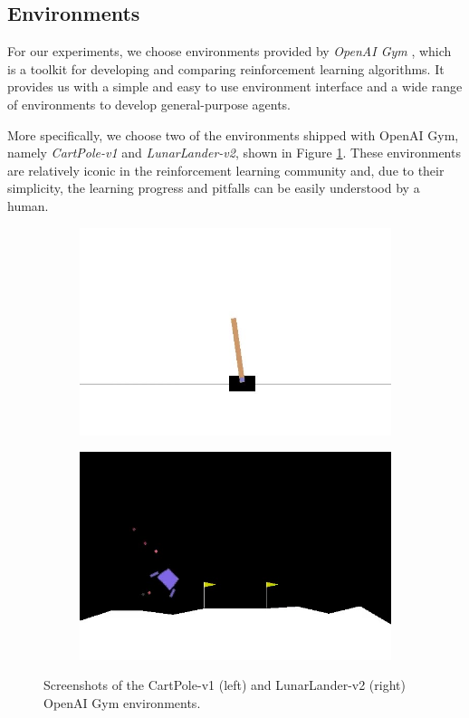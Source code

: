 \subsection{Environments}
For our experiments, we choose environments provided by \textit{OpenAI Gym} \cite{gym}, which is a toolkit for developing and comparing reinforcement learning algorithms. It provides us with a simple and easy to use environment interface and a wide range of environments to develop general-purpose agents.

More specifically, we choose two of the environments shipped with OpenAI Gym, namely \textit{CartPole-v1} and \textit{LunarLander-v2}, shown in Figure \ref{fig:environments}. These environments are relatively iconic in the reinforcement learning community and, due to their simplicity, the learning progress and pitfalls can be easily understood by a human.
\begin{figure}[b]
    \centering
    \begin{subfigure}{0.49\textwidth}
        \raggedleft
        \includegraphics[width=\textwidth]{assets/cartpole.jpg}
    \end{subfigure}
    \begin{subfigure}{0.5\textwidth}
        \raggedright
        \includegraphics[width=\textwidth]{assets/lunarlander.jpg}
    \end{subfigure}
    \caption{Screenshots of the CartPole-v1 (left) and LunarLander-v2 (right) OpenAI Gym environments.}
    \label{fig:environments}
\end{figure}
